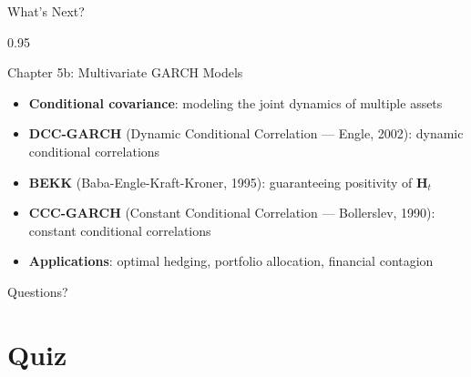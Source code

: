 \documentclass[9pt, aspectratio=169, t]{beamer}
\begin{document}
\begin{frame}{What's Next?}
    \begin{cminipage}{0.95\textwidth}
    {\footnotesize
    \begin{center}
    \begin{minipage}{0.85\textwidth}
    \begin{block}{Chapter 5b: Multivariate GARCH Models}
        \begin{itemize}\setlength{\itemsep}{0pt}
            \item \textbf{Conditional covariance}: modeling the joint dynamics of multiple assets
            \item \textbf{DCC-GARCH} (Dynamic Conditional Correlation --- Engle, 2002): dynamic conditional correlations
            \item \textbf{BEKK} (Baba-Engle-Kraft-Kroner, 1995): guaranteeing positivity of $\mathbf{H}_t$
            \item \textbf{CCC-GARCH} (Constant Conditional Correlation --- Bollerslev, 1990): constant conditional correlations
            \item \textbf{Applications}: optimal hedging, portfolio allocation, financial contagion
        \end{itemize}
    \end{block}
    \end{minipage}
    \end{center}

    \vspace{0.3cm}
    \begin{center}
    \Large\textcolor{MainBlue}{Questions?}
    \end{center}
    }
    \end{cminipage}
\end{frame}

\section{Quiz}
\end{document}
